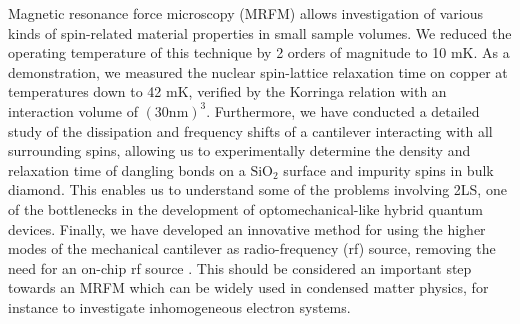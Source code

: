 Magnetic resonance force microscopy (MRFM) allows investigation of various kinds of spin-related material properties in small sample volumes. We reduced the operating temperature of this technique by 2 orders of magnitude to 10 mK. As a  demonstration, we measured the nuclear spin-lattice relaxation time on copper at temperatures down to 42 mK, verified by the Korringa relation \cite{Wagenaar_2016} with an interaction volume of $(30 \text{nm})^3$. 
Furthermore, we have conducted a detailed study of the dissipation and frequency shifts of a cantilever interacting with all surrounding spins, allowing us to experimentally determine the density and relaxation time of dangling bonds on a $\text{SiO}_2$ surface \cite{de_Voogd_2017} and impurity spins in bulk diamond. This enables us to understand some of the problems involving 2LS, one of the bottlenecks in the development of optomechanical-like hybrid quantum devices. 
Finally, we have developed an innovative method for using the higher modes of the mechanical cantilever as radio-frequency (rf) source, removing the need for an on-chip rf source \cite{Wagenaar_2017}. This should be considered an important step towards an MRFM which can be widely used in condensed matter physics, for instance to investigate inhomogeneous electron systems.